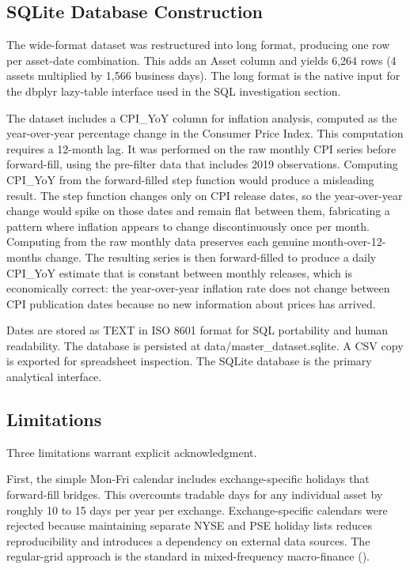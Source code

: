 \subsection{SQLite Database Construction}

The wide-format dataset was restructured into long format, producing one row per asset-date combination. This adds an Asset column and yields 6,264 rows (4 assets multiplied by 1,566 business days). The long format is the native input for the dbplyr lazy-table interface used in the SQL investigation section.

The dataset includes a CPI\_YoY column for inflation analysis, computed as the year-over-year percentage change in the Consumer Price Index. This computation requires a 12-month lag. It was performed on the raw monthly CPI series before forward-fill, using the pre-filter data that includes 2019 observations. Computing CPI\_YoY from the forward-filled step function would produce a misleading result. The step function changes only on CPI release dates, so the year-over-year change would spike on those dates and remain flat between them, fabricating a pattern where inflation appears to change discontinuously once per month. Computing from the raw monthly data preserves each genuine month-over-12-months change. The resulting series is then forward-filled to produce a daily CPI\_YoY estimate that is constant between monthly releases, which is economically correct: the year-over-year inflation rate does not change between CPI publication dates because no new information about prices has arrived.

Dates are stored as TEXT in ISO 8601 format for SQL portability and human readability. The database is persisted at data/master\_dataset.sqlite. A CSV copy is exported for spreadsheet inspection. The SQLite database is the primary analytical interface.

\subsection{Limitations}

Three limitations warrant explicit acknowledgment.

First, the simple Mon-Fri calendar includes exchange-specific holidays that forward-fill bridges. This overcounts tradable days for any individual asset by roughly 10 to 15 days per year per exchange. Exchange-specific calendars were rejected because maintaining separate NYSE and PSE holiday lists reduces reproducibility and introduces a dependency on external data sources. The regular-grid approach is the standard in mixed-frequency macro-finance (\cite{ghysels2016}).

